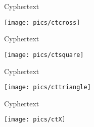 \documentclass[a4paper,10pt]{article}
\begin{document}
\phantom{a}
\begin{center}
{\Huge Cyphertext}

\vspace{4cm}
\texttt{[image: pics/ctcross]}
\end{center}

\newpage
\thispagestyle{empty}
\phantom{a}
\begin{center}
{\Huge Cyphertext}

\vspace{4cm}
\texttt{[image: pics/ctsquare]}
\end{center}

\newpage
\thispagestyle{empty}

\phantom{a}
\begin{center}
{\Huge Cyphertext}

\vspace{4cm}
\texttt{[image: pics/cttriangle]}
\end{center}

\newpage
\thispagestyle{empty}

\phantom{a}
\begin{center}
{\Huge Cyphertext}

\vspace{4cm}
\texttt{[image: pics/ctX]}
\end{center}


% 
% 
% 
\end{document}
